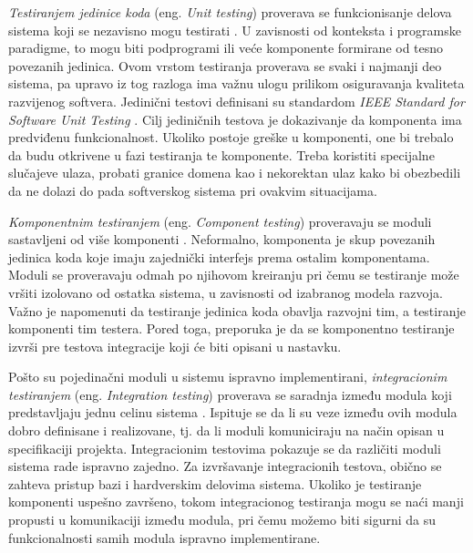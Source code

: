 \documentclass[12pt,oneside]{memoir}
\begin{document}
\emph{Testiranjem jedinice koda} (eng. \textit{Unit testing}) proverava se funkcionisanje delova sistema koji se nezavisno mogu testirati \cite{SoftwareUnitTesting}. U zavisnosti od konteksta i programske paradigme, to mogu biti podprogrami ili veće komponente formirane od tesno povezanih jedinica. Ovom vrstom testiranja proverava se svaki i najmanji deo sistema, pa upravo iz tog razloga ima važnu ulogu prilikom osiguravanja kvaliteta razvijenog softvera. Jedinični testovi definisani su standardom \textit{IEEE Standard for Software Unit Testing} \cite{IEEEStandard}. Cilj jediničnih testova je dokazivanje da komponenta ima predviđenu funkcionalnost. Ukoliko postoje greške u komponenti, one bi trebalo da budu otkrivene u fazi testiranja te komponente. Treba koristiti specijalne slučajeve ulaza, probati granice domena kao i nekorektan ulaz kako bi obezbedili da ne dolazi do pada softverskog sistema pri ovakvim situacijama.
\par
\emph{Komponentnim testiranjem} (eng. \textit{Component testing}) proveravaju se moduli sastavljeni od više komponenti \cite{ComponentTesting}. Neformalno, komponenta je skup povezanih jedinica koda koje imaju zajednički interfejs prema ostalim komponentama.  Moduli se proveravaju odmah po njihovom kreiranju pri čemu se testiranje može vršiti izolovano od ostatka sistema, u zavisnosti od izabranog modela razvoja. Važno je napomenuti da testiranje jedinica koda obavlja razvojni tim, a testiranje komponenti tim testera. Pored toga, preporuka je da se komponentno testiranje izvrši pre testova integracije koji će biti opisani u nastavku.
\par

Pošto su pojedinačni moduli u sistemu ispravno implementirani, \emph{integracionim testiranjem} (eng. \textit{Integration testing}) proverava se saradnja između modula koji predstavljaju jednu celinu sistema \cite{IntegrationTesting}. Ispituje se da li su veze između ovih modula dobro definisane i realizovane, tj. da li moduli komuniciraju na način opisan u specifikaciji projekta. 
Integracionim testovima pokazuje se da različiti moduli sistema rade ispravno zajedno. Za izvršavanje integracionih testova, obično se zahteva pristup bazi i hardverskim delovima sistema. Ukoliko je testiranje komponenti uspešno završeno, tokom integracionog testiranja mogu se naći manji propusti u komunikaciji između modula, pri čemu možemo biti sigurni da su funkcionalnosti samih modula ispravno implementirane.
\par
 
\end{document}
